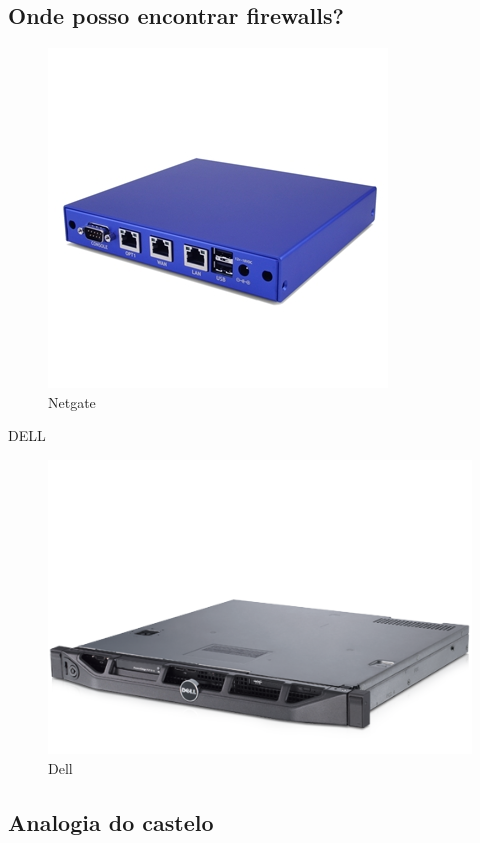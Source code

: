\subsection{Onde posso encontrar firewalls?}
\begin{frame}
	\begin{figure}
		\centering
		\includegraphics[height=0.3\textheight]{imagens/netgate.jpg}
		\caption{Netgate}
	\end{figure}
	
	DELL
	\begin{figure}
		\centering
		\includegraphics[height=0.3\textheight]{imagens/dell.png}
		\caption{Dell}
	\end{figure}

\end{frame}


\subsection{Analogia do castelo}


